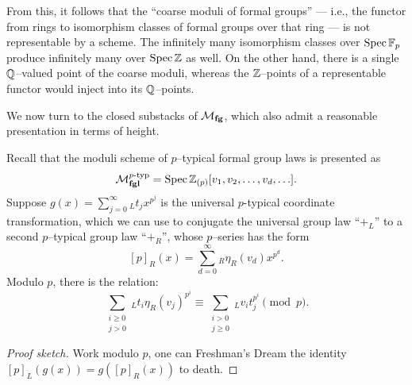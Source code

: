 \begin{remark}
From this, it follows that the ``coarse moduli of formal groups'' --- i.e., the functor from rings to isomorphism classes of formal groups over that ring --- is not representable by a scheme.  The infinitely many isomorphism classes over $\operatorname{Spec} \mathbb F_p$ produce infinitely many over $\operatorname{Spec} \mathbb Z$ as well.  On the other hand, there is a single $\mathbb{Q}$--valued point of the coarse moduli, whereas the $\mathbb Z$--points of a representable functor would inject into its $\mathbb{Q}$--points.
\end{remark}

We now turn to the closed substacks of $\mathcal{M}_{\mathbf{fg}}$, which also admit a reasonable presentation in terms of height.

\begin{lemma}
Recall that the moduli scheme of $p$--typical formal group laws is presented as \[\mathcal{M}_{\mathbf{fgl}}^{p\text{-}\mathrm{typ}} = \operatorname{Spec} \mathbb Z_{(p)}[v_1, v_2, \ldots, v_d, \ldots].\]  Suppose $g(x) = \sum_{j=0}^\infty {}_L t_j x^{p^j}$ is the universal $p$-typical coordinate transformation, which we can use to conjugate the universal group law ``$+_L$'' to a second $p$--typical group law ``$+_R$'', whose $p$--series has the form \[[p]_R(x) = \sum_{d=0}^\infty {}_R \eta_R(v_d) x^{p^d}.\]  Modulo $p$, there is the relation:
\[\sum_{\substack{i \ge 0 \\ j > 0}}{}_L t_i \eta_R(v_j)^{p^i} \equiv \sum_{\substack{i > 0 \\ j \ge 0}}{}_L v_i t_j^{p^i} \pmod p.\]
\end{lemma}
\begin{proof}[Proof sketch]
Work modulo $p$, one can Freshman's Dream the identity $[p]_L(g(x)) = g([p]_R(x))$ to death.
\end{proof}



